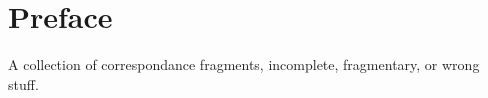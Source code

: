 \chapter{Preface}

A collection of correspondance fragments, incomplete, fragmentary, or wrong stuff.

